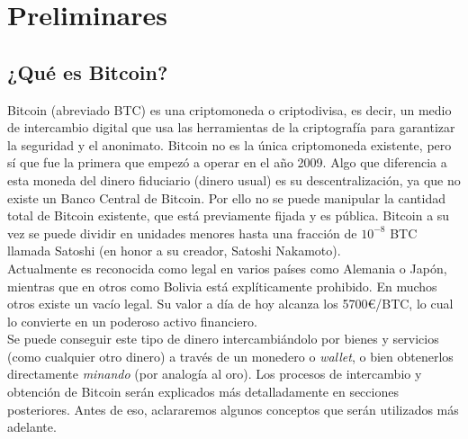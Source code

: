 \documentclass[twoside]{article}
\theoremstyle{definition}
\begin{document}
\newpage


\section{Preliminares}

\subsection{¿Qué es Bitcoin?}

Bitcoin (abreviado BTC) es una criptomoneda o criptodivisa, es decir, un medio de intercambio digital que usa las herramientas de la criptografía para garantizar la seguridad y el anonimato. Bitcoin no es la única criptomoneda existente, pero sí que fue la primera que empezó a operar en el año 2009. Algo que diferencia a esta moneda del dinero fiduciario (dinero usual) es su descentralización, ya que no existe un Banco Central de Bitcoin. Por ello no se puede manipular la cantidad total de Bitcoin existente, que está previamente fijada y es pública. Bitcoin a su vez se puede dividir en unidades menores hasta una fracción de $10^{-8}$ BTC llamada Satoshi (en honor a su creador, Satoshi Nakamoto).\\

Actualmente es reconocida como legal en varios países como Alemania o Japón, mientras que en otros como Bolivia está explíticamente prohibido. En muchos otros existe un vacío legal. Su valor a día de hoy alcanza los 5700\euro/BTC, lo cual lo convierte en un poderoso activo financiero. \\

Se puede conseguir este tipo de dinero intercambiándolo por bienes y servicios (como cualquier otro dinero) a través de un monedero o \emph{wallet}, o bien obtenerlos directamente \emph{minando} (por analogía al oro). Los procesos de intercambio y obtención de Bitcoin serán explicados más detalladamente en secciones posteriores. Antes de eso, aclararemos algunos conceptos que serán utilizados más adelante. 
\end{document}
